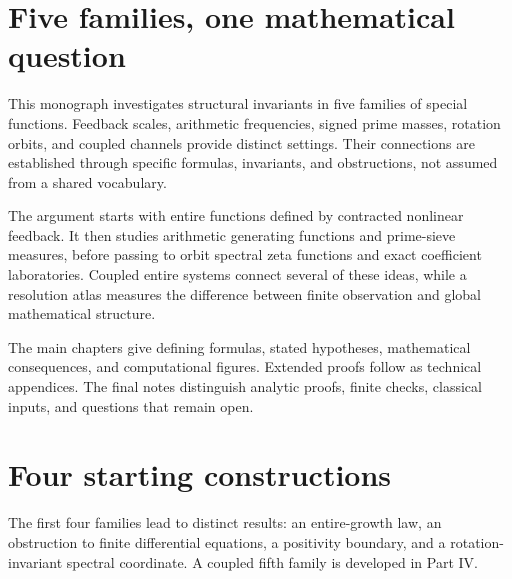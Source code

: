 \documentclass[11pt,oneside,openany]{book}
\begin{document}
\MonographCover
\frontmatter
\MonographTitleLeaf
\MonographPreface
\gdef\CurrentChapter{Contents}\tableofcontents
\clearpage
{}\label{reading-map}
\section*{Five families, one mathematical question}
This monograph investigates structural invariants in five families of special functions. Feedback scales, arithmetic frequencies, signed prime masses, rotation orbits, and coupled channels provide distinct settings. Their connections are established through specific formulas, invariants, and obstructions, not assumed from a shared vocabulary.

The argument starts with entire functions defined by contracted nonlinear feedback. It then studies arithmetic generating functions and prime-sieve measures, before passing to orbit spectral zeta functions and exact coefficient laboratories. Coupled entire systems connect several of these ideas, while a resolution atlas measures the difference between finite observation and global mathematical structure.

The main chapters give defining formulas, stated hypotheses, mathematical consequences, and computational figures. Extended proofs follow as technical appendices. The final notes distinguish analytic proofs, finite checks, classical inputs, and questions that remain open.

\section*{Four starting constructions}
The first four families lead to distinct results: an entire-growth law, an obstruction to finite differential equations, a positivity boundary, and a rotation-invariant spectral coordinate. A coupled fifth family is developed in Part IV.
\end{document}
